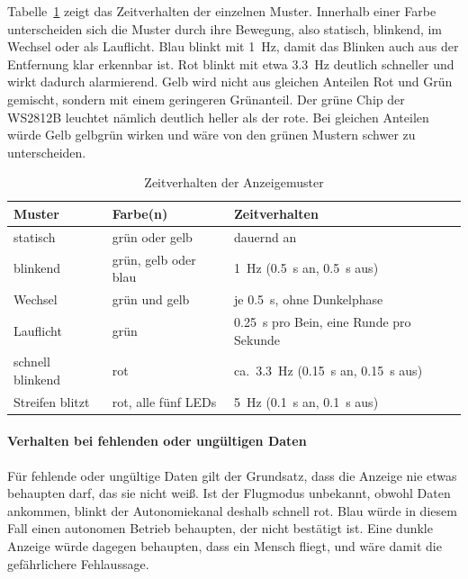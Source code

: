             Tabelle~\ref{tab:LED_Muster} zeigt das Zeitverhalten der einzelnen Muster. Innerhalb einer Farbe unterscheiden sich die Muster durch ihre Bewegung, also statisch, blinkend, im Wechsel oder als Lauflicht. Blau blinkt mit \SI{1}{\hertz}, damit das Blinken auch aus der Entfernung klar erkennbar ist. Rot blinkt mit etwa \SI{3,3}{\hertz} deutlich schneller und wirkt dadurch alarmierend. Gelb wird nicht aus gleichen Anteilen Rot und Grün gemischt, sondern mit einem geringeren Grünanteil. Der grüne Chip der WS2812B leuchtet nämlich deutlich heller als der rote. Bei gleichen Anteilen würde Gelb gelbgrün wirken und wäre von den grünen Mustern schwer zu unterscheiden.

            \begin{table}[H]
                \centering
                \caption{Zeitverhalten der Anzeigemuster}
                \label{tab:LED_Muster}
                \begin{tabularx}{\textwidth}{l l X}
                    \toprule
                    \textbf{Muster} & \textbf{Farbe(n)} & \textbf{Zeitverhalten} \\
                    \midrule
                    statisch          & grün oder gelb      & dauernd an \\
                    blinkend          & grün, gelb oder blau & \SI{1}{\hertz} (\SI{0,5}{\second} an, \SI{0,5}{\second} aus) \\
                    Wechsel           & grün und gelb       & je \SI{0,5}{\second}, ohne Dunkelphase \\
                    Lauflicht         & grün                & \SI{0,25}{\second} pro Bein, eine Runde pro Sekunde \\
                    schnell blinkend  & rot                 & ca.\ \SI{3,3}{\hertz} (\SI{0,15}{\second} an, \SI{0,15}{\second} aus) \\
                    Streifen blitzt   & rot, alle fünf LEDs & \SI{5}{\hertz} (\SI{0,1}{\second} an, \SI{0,1}{\second} aus) \\
                    \bottomrule
                \end{tabularx}
            \end{table}

            \paragraph{Verhalten bei fehlenden oder ungültigen Daten}
            \label{sec:LED_Fehlerfall}
            Für fehlende oder ungültige Daten gilt der Grundsatz, dass die Anzeige nie etwas behaupten darf, das sie nicht weiß. Ist der Flugmodus unbekannt, obwohl Daten ankommen, blinkt der Autonomiekanal deshalb schnell rot. Blau würde in diesem Fall einen autonomen Betrieb behaupten, der nicht bestätigt ist. Eine dunkle Anzeige würde dagegen behaupten, dass ein Mensch fliegt, und wäre damit die gefährlichere Fehlaussage.

